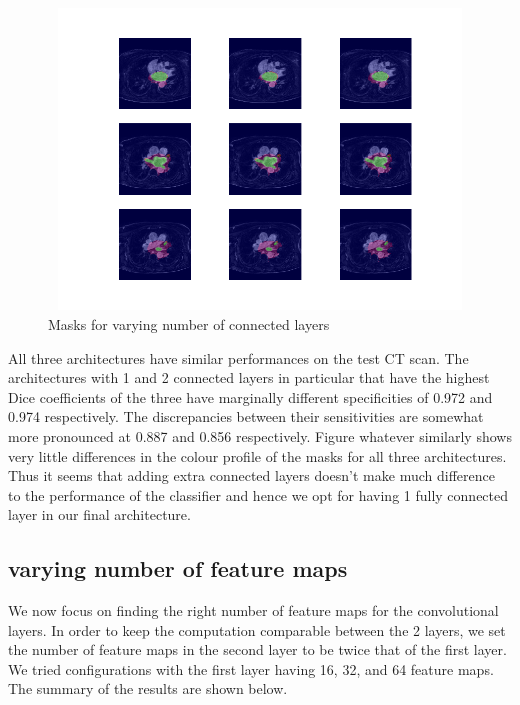 \begin{figure}
\centering
\includegraphics[trim=2.5cm 1.5cm 2cm 1.5cm, clip=true, height=80mm, width=150mm]{Chapter3/mask_results_varying_number_of_connected_layers.png}
\caption{Masks for varying number of connected layers}
\end{figure}

\noindent All three architectures have similar performances on the test CT scan. The architectures with 1 and 2 connected layers in particular that have the highest Dice coefficients of the three have marginally different specificities of 0.972 and 0.974 respectively. The discrepancies between their sensitivities are somewhat more pronounced at 0.887 and 0.856 respectively. Figure whatever similarly shows very little differences in the colour profile of the masks for all three architectures. Thus it seems that adding extra connected layers doesn't make much difference to the performance of the classifier and hence we opt for having 1 fully connected layer in our final architecture.

\subsection{varying number of feature maps}

\noindent We now focus on finding the right number of feature maps for the convolutional layers. In order to keep the computation comparable between the 2 layers, we set the number of feature maps in the second layer to be twice that of the first layer. We tried configurations with the first layer having 16, 32, and 64 feature maps. The summary of the results are shown below.\\

